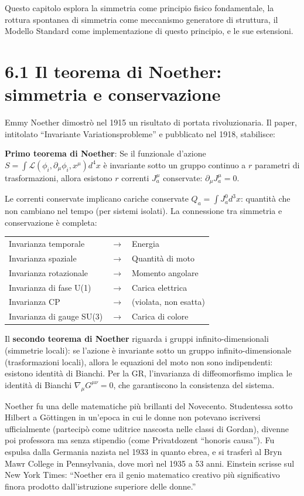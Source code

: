 \documentclass[11.5pt,a4paper,openany]{book}
\theoremstyle{remark}
\begin{document}
Questo capitolo esplora la simmetria come principio fisico fondamentale, la rottura spontanea di simmetria come meccanismo generatore di struttura, il Modello Standard come implementazione di questo principio, e le sue estensioni.

\section{6.1 Il teorema di Noether: simmetria e conservazione}

Emmy Noether dimostrò nel 1915 un risultato di portata rivoluzionaria. Il paper, intitolato ``Invariante Variationsprobleme'' e pubblicato nel 1918, stabilisce:

\textbf{Primo teorema di Noether}: Se il funzionale d'azione $S = \int \mathcal{L}(\phi_i, \partial_\mu\phi_i, x^\mu) d^4x$ è invariante sotto un gruppo continuo a $r$ parametri di trasformazioni, allora esistono $r$ correnti $J^\mu_a$ conservate: $\partial_\mu J^\mu_a = 0$.

Le correnti conservate implicano cariche conservate $Q_a = \int J^0_a d^3x$: quantità che non cambiano nel tempo (per sistemi isolati). La connessione tra simmetria e conservazione è completa:

\begin{center}
\begin{tabular}{lcl}
Invarianza temporale & $\to$ & Energia \\
Invarianza spaziale & $\to$ & Quantità di moto \\
Invarianza rotazionale & $\to$ & Momento angolare \\
Invarianza di fase U(1) & $\to$ & Carica elettrica \\
Invarianza CP & $\to$ & (violata, non esatta) \\
Invarianza di gauge SU(3) & $\to$ & Carica di colore
\end{tabular}
\end{center}

Il \textbf{secondo teorema di Noether} riguarda i gruppi infinito-dimensionali (simmetrie locali): se l'azione è invariante sotto un gruppo infinito-dimensionale (trasformazioni locali), allora le equazioni del moto non sono indipendenti: esistono identità di Bianchi. Per la GR, l'invarianza di diffeomorfismo implica le identità di Bianchi $\nabla_\mu G^{\mu\nu} = 0$, che garantiscono la consistenza del sistema.

Noether fu una delle matematiche più brillanti del Novecento. Studentessa sotto Hilbert a Göttingen in un'epoca in cui le donne non potevano iscriversi ufficialmente (partecipò come uditrice nascosta nelle classi di Gordan), divenne poi professora ma senza stipendio (come Privatdozent ``honoris causa''). Fu espulsa dalla Germania nazista nel 1933 in quanto ebrea, e si trasferì al Bryn Mawr College in Pennsylvania, dove morì nel 1935 a 53 anni. Einstein scrisse sul New York Times: ``Noether era il genio matematico creativo più significativo finora prodotto dall'istruzione superiore delle donne.''
\end{document}
